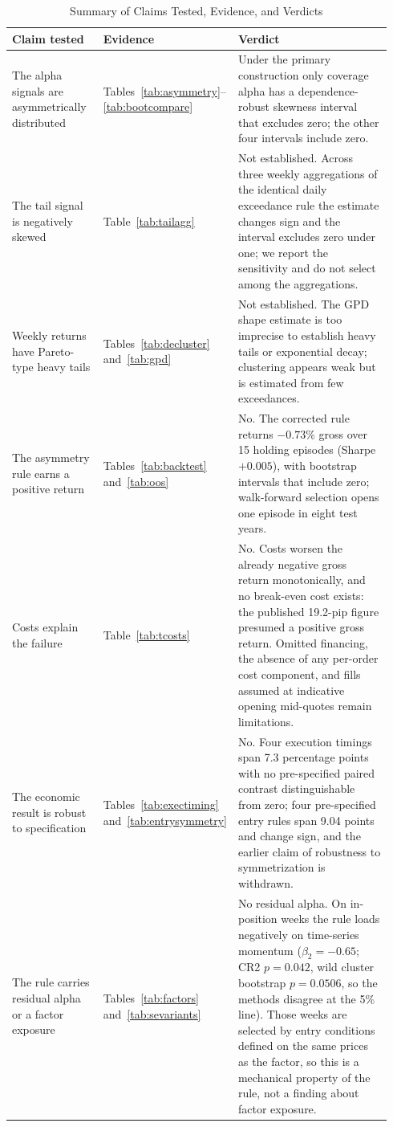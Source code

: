 \documentclass[11pt]{article}
\begin{document}
\begin{table}[H]
\centering
\caption{Summary of Claims Tested, Evidence, and Verdicts}
\label{tab:claims}
\footnotesize
\begin{tabular}{@{}>{\raggedright\arraybackslash}p{0.25\linewidth}>{\raggedright\arraybackslash}p{0.17\linewidth}>{\raggedright\arraybackslash}p{0.52\linewidth}@{}}
\toprule
Claim tested & Evidence & Verdict \\
\midrule
The alpha signals are asymmetrically distributed & Tables~\ref{tab:asymmetry}--\ref{tab:bootcompare} & Under the primary construction only coverage alpha has a dependence-robust skewness interval that excludes zero; the other four intervals include zero. \\
The tail signal is negatively skewed & Table~\ref{tab:tailagg} & Not established. Across three weekly aggregations of the identical daily exceedance rule the estimate changes sign and the interval excludes zero under one; we report the sensitivity and do not select among the aggregations. \\
Weekly returns have Pareto-type heavy tails & Tables~\ref{tab:decluster} and~\ref{tab:gpd} & Not established. The GPD shape estimate is too imprecise to establish heavy tails or exponential decay; clustering appears weak but is estimated from few exceedances. \\
The asymmetry rule earns a positive return & Tables~\ref{tab:backtest} and~\ref{tab:oos} & No. The corrected rule returns $-0.73\%$ gross over 15 holding episodes (Sharpe $+0.005$), with bootstrap intervals that include zero; walk-forward selection opens one episode in eight test years. \\
Costs explain the failure & Table~\ref{tab:tcosts} & No. Costs worsen the already negative gross return monotonically, and no break-even cost exists: the published 19.2-pip figure presumed a positive gross return. Omitted financing, the absence of any per-order cost component, and fills assumed at indicative opening mid-quotes remain limitations. \\
The economic result is robust to specification & Tables~\ref{tab:exectiming} and~\ref{tab:entrysymmetry} & No. Four execution timings span 7.3 percentage points with no pre-specified paired contrast distinguishable from zero; four pre-specified entry rules span 9.04 points and change sign, and the earlier claim of robustness to symmetrization is withdrawn. \\
The rule carries residual alpha or a factor exposure & Tables~\ref{tab:factors} and~\ref{tab:sevariants} & No residual alpha. On in-position weeks the rule loads negatively on time-series momentum ($\beta_2 = -0.65$; CR2 $p = 0.042$, wild cluster bootstrap $p = 0.0506$, so the methods disagree at the 5\% line). Those weeks are selected by entry conditions defined on the same prices as the factor, so this is a mechanical property of the rule, not a finding about factor exposure. \\

\end{tabular}
\end{table}
\end{document}
